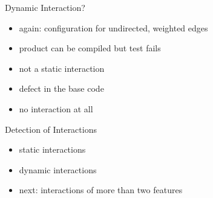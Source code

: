 \begin{frame}{\myframetitle}\setlength\leftmargini{3mm}
	\begin{fancycolumns}[widths={70}]
	\nextcolumn
		\begin{example}{Dynamic Interaction?}
			\begin{itemize}
				\item again: configuration for undirected, weighted edges
				\item product can be compiled but test fails
				\item not a static interaction
				\item defect in the base code
				\item no interaction at all
			\end{itemize}
		\end{example}
		\begin{note}{Detection of Interactions}
			\begin{itemize}
				\item static interactions\\\mysource{\lectureanalyses}
				\item dynamic interactions\\\mysource{\lecturetesting}
				\item next: interactions of more than two features
			\end{itemize}
		\end{note}
	\end{fancycolumns}
\end{frame}



